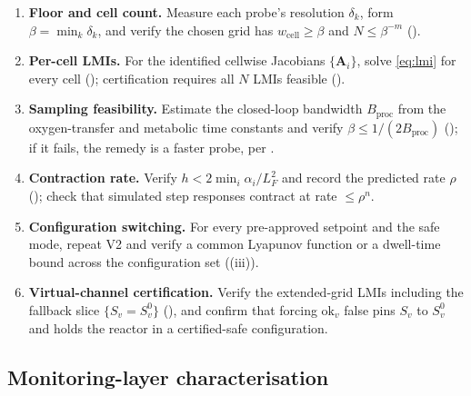 \documentclass[11pt,a4paper,twocolumn]{article}
\theoremstyle{thmstyle}
\theoremstyle{definition}
\theoremstyle{remark}
\newcommand{\wcell}{w_{\mathrm{cell}}}
\newcommand{\floor}{\beta}
\newcommand{\Bproc}{B_{\mathrm{proc}}}
\begin{document}
\begin{enumerate}[label=\textbf{V\arabic*.},leftmargin=2.4em,itemsep=2pt]
\item \textbf{Floor and cell count.} Measure each probe's resolution
$\delta_k$, form $\floor=\min_k\delta_k$, and verify the chosen grid has
$\wcell\ge\floor$ and $N\le\floor^{-m}$ ().
\item \textbf{Per-cell LMIs.} For the identified cellwise Jacobians
$\{\mathbf A_i\}$, solve \eqref{eq:lmi} for every cell
(); certification requires all $N$ LMIs feasible
().
\item \textbf{Sampling feasibility.} Estimate the closed-loop bandwidth
$\Bproc$ from the oxygen-transfer and metabolic time constants and verify
$\floor\le1/(2\Bproc)$ (); if it fails, the remedy is a
faster probe, per .
\item \textbf{Contraction rate.} Verify $h<2\min_i\alpha_i/L_F^2$ and
record the predicted rate $\rho$ (); check that
simulated step responses contract at rate $\le\rho^n$.
\item \textbf{Configuration switching.} For every pre-approved setpoint
and the safe mode, repeat V2 and verify a common Lyapunov function or a
dwell-time bound across the configuration set ((iii)).
\item \textbf{Virtual-channel certification.} Verify the extended-grid
LMIs including the fallback slice $\{S_v=S_v^{0}\}$
(), and confirm that forcing $\mathrm{ok}_v$
false pins $S_v$ to $S_v^{0}$ and holds the reactor in a certified-safe
configuration.
\end{enumerate}

\subsection{Monitoring-layer characterisation}
\end{document}
